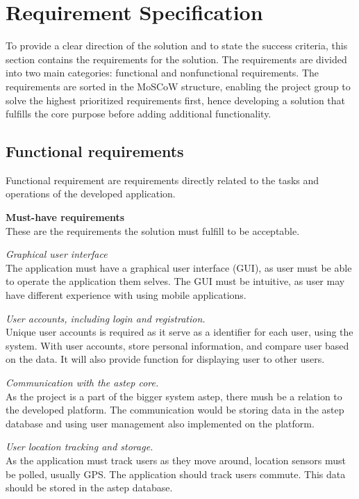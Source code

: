 \section{Requirement Specification}\label{sec:req}
To provide a clear direction of the solution and to state the success criteria, this section contains the requirements for the solution. 
The requirements are divided into two main categories: functional and nonfunctional requirements. 
The requirements are sorted in the MoSCoW structure, enabling the project group to solve the highest prioritized requirements first, hence developing a solution that fulfills the core purpose before adding additional functionality.


\subsection{Functional requirements}
Functional requirement are requirements directly related to the tasks and operations of the developed application.

\textbf{Must-have requirements}\\
These are the requirements the solution must fulfill to be acceptable.

\textit{Graphical user interface}\\
The application must have a graphical user interface (GUI), as user must be able to operate the application them selves. 
The GUI must be intuitive, as user may have different experience with using mobile applications.

\textit{User accounts, including login and registration.}\\
Unique user accounts is required as it serve as a identifier for each user, using the system. With user accounts, store personal information, and compare user based on the data. 
It will also provide function for displaying user to other users.

\textit{Communication with the \gls{astep} core.}\\
As the project is a part of the bigger system \gls{astep}, there mush be a relation to the developed platform. 
The communication would be storing data in the \gls{astep} database and using user management also implemented on the platform.

\textit{User location tracking and storage.}\\
As the application must track users as they move around, location sensors must be polled, usually GPS. 
The application should track users commute.
This data should be stored in the \gls{astep} database.

